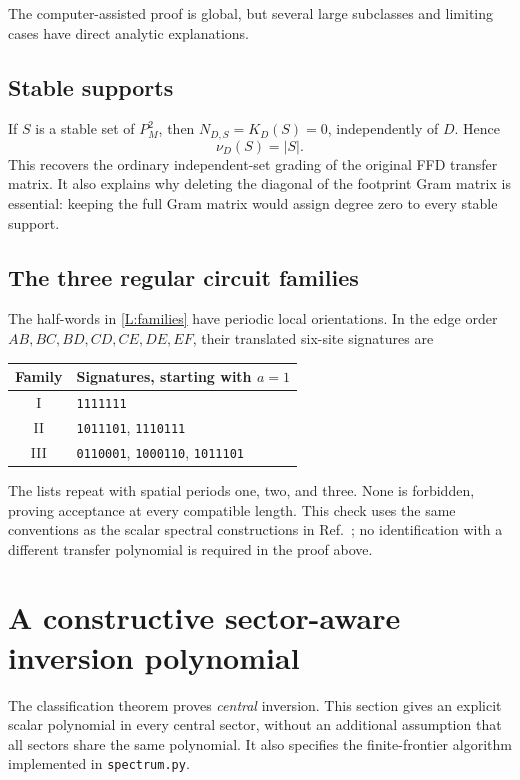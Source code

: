 \documentclass[10pt,letterpaper]{article}
\newcommand{\code}[1]{\nolinkurl{#1}}
\begin{document}
The computer-assisted proof is global, but several large subclasses and limiting cases have direct analytic explanations.

\subsection{Stable supports}

If \(S\) is a stable set of \(P_M^2\), then \(N_{D,S}=K_D(S)=0\), independently of \(D\).  Hence
\[
 \nu_D(S)=|S|.
\]
This recovers the ordinary independent-set grading of the original FFD transfer matrix.  It also explains why deleting the diagonal of the footprint Gram matrix is essential: keeping the full Gram matrix would assign degree zero to every stable support.

\subsection{The three regular circuit families}
The half-words in \eqref{L:families} have periodic local orientations. In the edge order \(AB,BC,BD,CD,CE,DE,EF\), their translated six-site signatures are
\begin{center}
\begin{tabular}{@{}cl@{}}\toprule
Family & Signatures, starting with \(a=1\)\\ \midrule
I & \texttt{1111111}\\
II & \texttt{1011101}, \texttt{1110111}\\
III & \texttt{0110001}, \texttt{1000110}, \texttt{1011101}\\\bottomrule
\end{tabular}
\end{center}
The lists repeat with spatial periods one, two, and three. None is forbidden, proving acceptance at every compatible length. This check uses the same conventions as the scalar spectral constructions in Ref.~\cite{SzaszSchagrinEtAl2026}; no identification with a different transfer polynomial is required in the proof above.

\section{A constructive sector-aware inversion polynomial}\label{supp:sectoralgorithm}

The classification theorem proves \emph{central} inversion. This section gives an explicit scalar polynomial in every central sector, without an additional assumption that all sectors share the same polynomial. It also specifies the finite-frontier algorithm implemented in \code{spectrum.py}.
\end{document}
